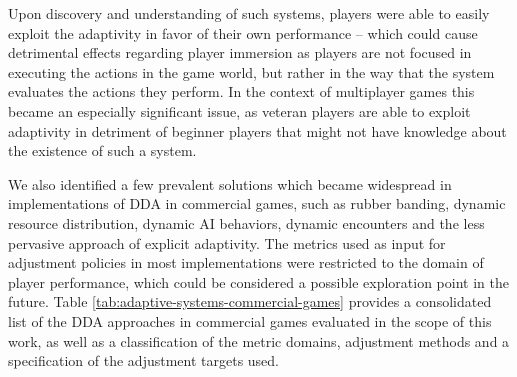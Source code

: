 Upon discovery and understanding of such systems, players were able to easily exploit the adaptivity in favor of their own performance -- which could cause detrimental effects regarding player immersion as players are not focused in executing the actions in the game world, but rather in the way that the system evaluates the actions they perform. In the context of multiplayer games this became an especially significant issue, as veteran players are able to exploit adaptivity in detriment of beginner players that might not have knowledge about the existence of such a system.

We also identified a few prevalent solutions which became widespread in implementations of DDA in commercial games, such as rubber banding, dynamic resource distribution, dynamic AI behaviors, dynamic encounters and the less pervasive approach of explicit adaptivity. The metrics used as input for adjustment policies in most implementations were restricted to the domain of player performance, which could be considered a possible exploration point in the future. Table \ref{tab:adaptive-systems-commercial-games} provides a consolidated list of the DDA approaches in commercial games evaluated in the scope of this work, as well as a classification of the metric domains, adjustment methods and a specification of the adjustment targets used.



